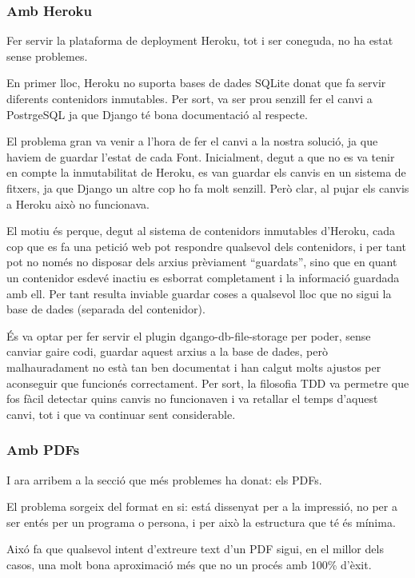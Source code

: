 \documentclass{article}
\begin{document}
\subsubsection{Amb Heroku}

Fer servir la plataforma de deployment Heroku, tot i ser coneguda, no ha estat sense problemes.

En primer lloc, Heroku no suporta bases de dades SQLite donat que fa servir diferents contenidors inmutables. Per sort, va ser prou senzill fer el canvi a PostrgeSQL ja que Django té bona documentació al respecte.

El problema gran va venir a l'hora de fer el canvi a la nostra solució, ja que haviem de guardar l'estat de cada Font. Inicialment, degut a que no es va tenir en compte la inmutabilitat de Heroku, es van guardar els canvis en un sistema de fitxers, ja que Django un altre cop ho fa molt senzill. Però clar, al pujar els canvis a Heroku això no funcionava.

El motiu és perque, degut al sistema de contenidors inmutables d'Heroku, cada cop que es fa una petició web pot respondre qualsevol dels contenidors, i per tant pot no només no disposar dels arxius prèviament ``guardats'', sino que en quant un contenidor esdevé inactiu es esborrat completament i la informació guardada amb ell. Per tant resulta inviable guardar coses a qualsevol lloc que no sigui la base de dades (separada del contenidor).

És va optar per fer servir el plugin dgango-db-file-storage per poder, sense canviar gaire codi, guardar aquest arxius a la base de dades, però malhauradament no està tan ben documentat i han calgut molts ajustos per aconseguir que funcionés correctament. Per sort, la filosofia TDD va permetre que fos fàcil detectar quins canvis no funcionaven i va retallar el temps d'aquest canvi, tot i que va continuar sent considerable.


\newpage

\subsubsection{Amb PDFs}

I ara arribem a la secció que més problemes ha donat: els PDFs.

El problema sorgeix del format en si: está dissenyat per a la impressió, no per a ser entés per un programa o persona, i per això la estructura que té és mínima.

Aixó fa que qualsevol intent d'extreure text d'un PDF sigui, en el millor dels casos, una molt bona aproximació més que no un procés amb 100\% d'èxit.
\end{document}
